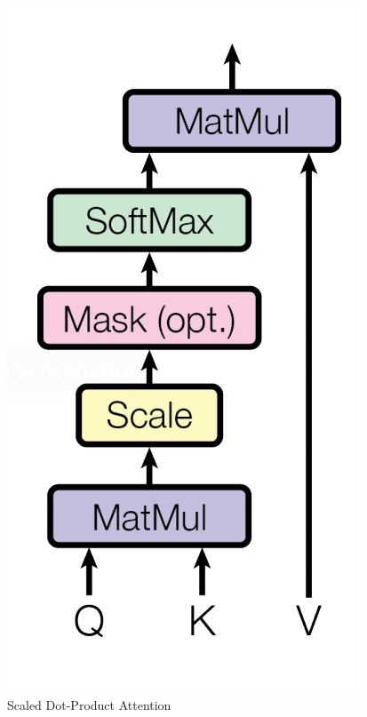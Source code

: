 \documentclass[9pt]{beamer}%
\begin{document}
\begin{frame}
\begin{columns}
		\begin{figure}
			\includegraphics[scale=0.12]{ScaledDotProdAtt}
			\caption{Scaled Dot-Product Attention}

\end{figure}
\end{columns}
\end{frame}
\end{document}
